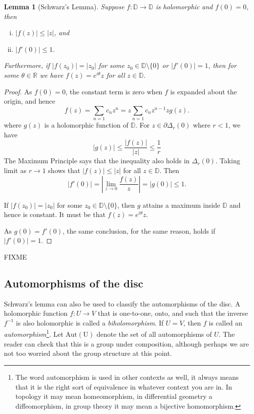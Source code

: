 \documentclass[12pt,openany]{book}
\newcommand{\sabs}[1]{\lvert {#1} \rvert}
\newcommand{\abs}[1]{\left\lvert {#1} \right\rvert}
\newcommand{\R}{{\mathbb{R}}}
\newcommand{\D}{{\mathbb{D}}}
\newcommand{\myindex}[1]{#1\index{#1}}
\theoremstyle{plain}
\newtheorem{lemma}[thm]{Lemma}
\theoremstyle{remark}
\theoremstyle{definition}
\theoremstyle{exercise}
\theoremstyle{example}
\begin{document}
\begin{lemma}[Schwarz's Lemma]
Suppose $f \colon \D \to \D$ is holomorphic and $f(0) = 0$,
then 
\begin{enumerate}[(i)]
\item $\sabs{f(z)} \leq \sabs{z}$, and
\item $\sabs{f'(0)} \leq 1$.
\end{enumerate}
Furthermore, if $\sabs{f(z_0)} = \sabs{z_0}$ for some $z_0 \in \D \setminus
\{ 0 \}$
or $\sabs{f'(0)} = 1$, then
for some $\theta \in \R$ we have $f(z) =
e^{i\theta} z$ for all $z \in \D$.
\end{lemma}

\begin{proof}
As $f(0) = 0$, the constant term is zero when $f$ is expanded about the
origin, and hence
\begin{equation*}
f(z) = \sum_{n=1} c_n z^n = z \sum_{n=1} c_n z^{n-1} z g(z) .
\end{equation*}
where $g(z)$ is a holomorphic function of $\D$.  For $z \in \partial \Delta_r(0)$
where $r < 1$, we have
\begin{equation*}
\sabs{g(z)} \leq \frac{\sabs{f(z)}}{\sabs{z}} \leq \frac{1}{r}
\end{equation*}
The Maximum Principle says that the inequality also holds in $\Delta_r(0)$.
Taking limit as $r \to 1$ shows that $\sabs{f(z)} \leq \sabs{z}$ for all $z
\in \D$.  Then
\begin{equation*}
\sabs{f'(0)}
=
\abs{\lim_{z \to 0} \frac{f(z)}{z}} = \sabs{g(0)} \leq 1 .
\end{equation*}

If $\sabs{f(z_0)} = \sabs{z_0}$ for some $z_0 \in \D \setminus \{ 0 \}$,
then $g$ attains a maximum inside $\D$ and hence is constant.
It must be that $f(z) = e^{i \theta} z$.

As $g(0) = f'(0)$, the same conclusion, for the same reason,
holds if $\sabs{f'(0)} = 1$.
\end{proof}

FIXME

\subsection{Automorphisms of the disc}

Schwarz's lemma can also be used to classify the automorphisms of the disc.
A holomorphic function $f \colon U \to V$ that is one-to-one, onto, and
such that the inverse $f^{-1}$ is also holomorphic is called a
\emph{\myindex{biholomorphism}}.  If $U = V$, then $f$ is called an
\emph{\myindex{automorphism}}\footnote{%
The word automorphism is used in other contexts as well, it always means
that it is the right sort of equivalence in whatever context you are in.
In topology it may mean homeomorphism, in differential geometry a
diffeomorphism, in group theory it may mean a bijective homomorphism.}.
Let
$\operatorname{Aut(U)}$ denote the set of all automorphisms of $U$.
The reader can check that this is a group under composition,
although perhaps we are
not too worried about the group structure at this point.
\end{document}
